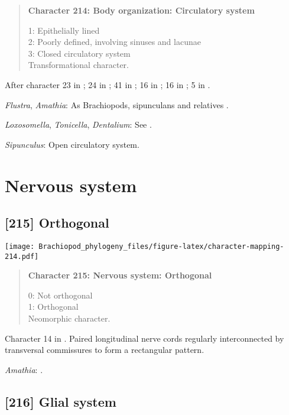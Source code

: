 \documentclass[openany]{book}
\theoremstyle{definition}
\theoremstyle{definition}
\theoremstyle{definition}
\theoremstyle{remark}
\begin{document}
\begin{quote}
\textbf{Character 214: Body organization: Circulatory system}

1: Epithelially lined\\
2: Poorly defined, involving sinuses and lacunae\\
3: Closed circulatory system\\
Transformational character.
\end{quote}

After character 23 in \citet{Haszprunar1996}; 24 in
\citet{Haszprunar2000}; 41 in \citet{Rouse1999}; 16 in
\citet{Scheltema1993}; 16 in \citet{Vinther2008}; 5 in
\citet{Haszprunar2008}.

\hypertarget{Amathia-coding-214}{}
\emph{Flustra}, \emph{Amathia}: As Brachiopods, sipunculans and
relatives \citep{Ruppert1983}.

\hypertarget{Dentalium-coding-214}{}
\emph{Loxosomella}, \emph{Tonicella}, \emph{Dentalium}: See
\citet{Haszprunar2008}.

\hypertarget{Sipunculus-coding-214}{}
\emph{Sipunculus}: Open circulatory system.

\section{Nervous system}\label{nervous-system}

\subsection*{{[}215{]} Orthogonal}\label{orthogonal}

\texttt{[image: Brachiopod\_phylogeny\_files/figure-latex/character-mapping-214.pdf]}

\begin{quote}
\textbf{Character 215: Nervous system: Orthogonal}

0: Not orthogonal\\
1: Orthogonal\\
Neomorphic character.
\end{quote}

Character 14 in \citet{Haszprunar1996}. Paired longitudinal nerve cords
regularly interconnected by transversal commissures to form a
rectangular pattern.

\hypertarget{Amathia-coding-215}{}
\emph{Amathia}: \citet{Temereva2016Thenervous}.

\subsection*{{[}216{]} Glial system}\label{glial-system}
\end{document}
